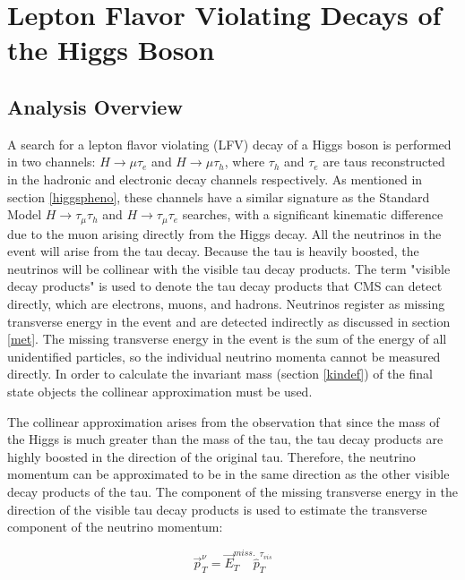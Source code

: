 \documentclass[oneside, letterpaper, oldfontcommands]{memoir}
\begin{document}
\chapter{Lepton Flavor Violating Decays of the Higgs Boson}\label{lfv}

\section{Analysis Overview}\label{lfvoverview}
\qquad A search for a lepton flavor violating (LFV) decay of a Higgs boson is performed in two channels: $H \rightarrow \mu\tau_{e}$ and $H \rightarrow \mu\tau_{h}$, where $\tau_{h}$ and $\tau_{e}$ are taus reconstructed in the hadronic and electronic decay channels respectively. As mentioned in section \ref{higgspheno}, these channels have a similar signature as the Standard Model $H \rightarrow \tau_{\mu} \tau_{h}$ and $H \rightarrow \tau_{\mu}\tau_{e}$ searches, with a significant kinematic difference due to the muon arising directly from the Higgs decay. All the neutrinos in the event will arise from the tau decay. Because the tau is heavily boosted, the neutrinos will be collinear with the visible tau decay products. The term "visible decay products" is used to denote the tau decay products that CMS can detect directly, which are electrons, muons, and hadrons. Neutrinos register as missing transverse energy in the event and are detected indirectly as discussed in section \ref{met}. The missing transverse energy in the event is the sum of the energy of all unidentified particles, so the individual neutrino momenta cannot be measured directly. In order to calculate the invariant mass (section \ref{kindef}) of the final state objects the collinear approximation must be used.

\qquad The collinear approximation\cite{Ellis:1987xu} arises from the observation that since the mass of the Higgs is much greater than the mass of the tau, the tau decay products are highly boosted in the direction of the original tau. Therefore, the neutrino momentum can be approximated to be in the same direction as the other visible decay products of the tau. The component of the missing transverse energy in the direction of the visible tau decay products is used to estimate the transverse component of the neutrino momentum:

\begin{equation}
\vec{p}_{T}^{\nu} = \vec{E}_{T}^{miss} \dot \hat{p}_{T}^{\tau_{vis}}
\end{equation}
\end{document}
